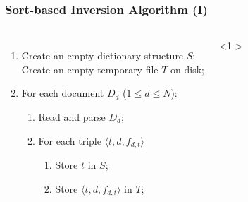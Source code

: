 \documentclass[svgnames]{beamer}
\begin{document}
\begin{frame}
    \frametitle{Sort-based Inversion Algorithm (I)}
    
    \begin{columns}

        \begin{enumerate}
        \item Create an empty dictionary structure $S$;\\
            Create an empty temporary file $T$ on disk;
        \item For each document $D_d$ ($1 \leq d \leq N$):
            \begin{enumerate}
            \item Read and parse $D_d$;
            \item For each triple $\langle t, d, f_{d,t} \rangle$
                \begin{enumerate}
                \item Store $t$ in $S$;
                \item Store $\langle t, d, f_{d,t} \rangle$ in $T$;
                \end{enumerate}
            \end{enumerate}
        \end{enumerate}

        <1->


\end{columns}
\end{frame}
\end{document}

